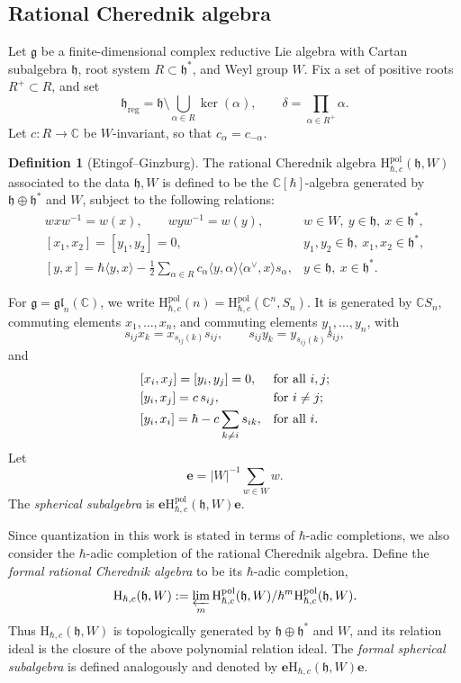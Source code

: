 \documentclass[11pt,reqno]{amsart}
\theoremstyle{definition}
\newtheorem{definition}[theorem]{Definition}
\newcommand{\bbC}{\mathbb{C}}
\newcommand{\gl}{\mathfrak{gl}}
\newcommand{\be}{\mathbf{e}}
\newcommand{\fkg}{\mathfrak{g}}
\newcommand{\rmH}{\mathrm{H}}
\newcommand{\fkh}{\mathfrak{h}}
\newcommand{\reg}{\mathrm{reg}}
\newcommand{\pol}{\mathrm{pol}}
\begin{document}
\subsection{Rational Cherednik algebra}

Let \(\fkg\) be a finite-dimensional complex reductive Lie algebra with Cartan subalgebra \(\fkh\), root system \(R\subset\fkh^*\), and Weyl group \(W\). Fix a set of positive roots \(R^+\subset R\), and set
\[
\fkh_{\reg}=\fkh\setminus\bigcup_{\alpha\in R}\ker(\alpha),
\qquad
\delta=\prod_{\alpha\in R^+}\alpha.
\]
Let \(c:R\to\bbC\) be \(W\)-invariant, so that \(c_\alpha=c_{-\alpha}\).

\begin{definition}[Etingof--Ginzburg]\label{def: rca}
The rational Cherednik algebra \(\rmH_{\hbar,c}^{\mathrm{pol}}(\fkh,W)\) associated to the data
\(\fkh, W\) is defined to be the
\(\bbC[\hbar]\)-algebra generated by
\(\fkh\oplus\fkh^*\) and \(W\), subject to the following relations:
\[\begin{array}{ll}
w x w^{-1}=w(x),\qquad w y w^{-1}=w(y),
&w\in W,\ y\in\fkh,\ x\in\fkh^*,\\[1mm]
[x_1,x_2]=[y_1,y_2]=0,
&y_1,y_2\in\fkh,\ x_1,x_2\in\fkh^*,\\[1mm]
\displaystyle
[y,x]=\hbar\langle y,x\rangle-\frac{1}{2}\sum_{\alpha\in R}c_\alpha
\langle y,\alpha\rangle\langle\alpha^\vee,x\rangle s_\alpha,
&y\in\fkh,\ x\in\fkh^*.
	\end{array}
    \]
\end{definition}

For \(\fkg=\gl_n(\bbC)\), we write
\(\rmH_{\hbar,c}^\pol (n)=\rmH_{\hbar,c} ^\pol (\bbC^n,S_n)\). It is generated by
\(\bbC S_n\), commuting elements \(x_1,\dots,x_n\), and commuting elements
\(y_1,\dots,y_n\), with
\[
s_{ij}x_k=x_{s_{ij}(k)}s_{ij},
\qquad
s_{ij}y_k=y_{s_{ij}(k)}s_{ij},
\]
and
\[
\begin{array}{ll}
\relax [x_i,x_j]=[y_i,y_j]=0, &\text{for all }i,j;\\[1mm]
\relax [y_i,x_j]=c\,s_{ij}, &\text{for }i\neq j;\\[1mm]
\relax 
\displaystyle [y_i,x_i]=\hbar-c\sum_{k\neq i}s_{ik}, &\text{for all }i.
\end{array}
\]
Let
\[
\be=|W|^{-1}\sum_{w\in W}w.
\]
The \emph{spherical subalgebra} is \(\be\rmH_{\hbar,c}^\pol(\fkh,W)\be\).

{Since quantization in this work is stated in terms of \(\hbar\)-adic completions, we also consider the \(\hbar\)-adic completion of the rational Cherednik algebra.
Define the {\it formal rational Cherednik algebra} to be its
\(\hbar\)-adic completion,
\[
\rmH_{\hbar,c}(\fkh,W)
:=
\varprojlim_m
\rmH_{\hbar,c}^{\mathrm{pol}}(\fkh,W)/
\hbar^m\rmH_{\hbar,c}^{\mathrm{pol}}(\fkh,W).
\]
Thus \(\rmH_{\hbar,c}(\fkh,W)\) is topologically generated by
\(\fkh\oplus\fkh^*\) and \(W\), and its relation ideal is the closure of the above polynomial relation ideal.
The {\it formal spherical subalgebra} is defined analogously and
denoted by \(\be \rmH_{\hbar,c}(\fkh, W) \be\).}
\end{document}

